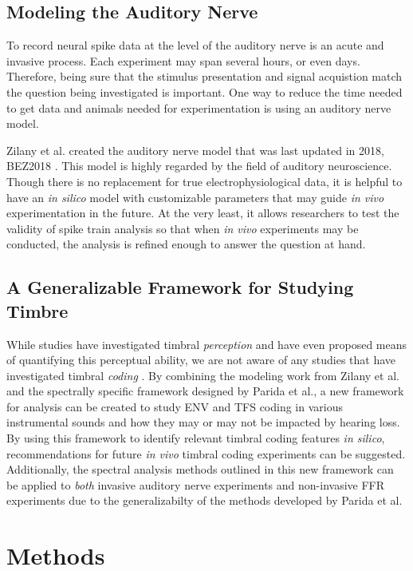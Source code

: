 \documentclass[conference]{IEEEtran}
\begin{document}
\subsection{Modeling the Auditory Nerve} 

To record neural spike data at the level of the auditory nerve is an acute and invasive process. Each experiment may span several hours, or even days.  Therefore, being sure that the stimulus presentation and signal acquistion match the question being investigated is important. One way to reduce the time needed to get data and animals needed for experimentation is using an auditory nerve model.

Zilany et al. created the auditory nerve model that was last updated in 2018, BEZ2018 \cite{bruce_phenomenological_2018}. This model is highly regarded by the field of auditory neuroscience. Though there is no replacement for true electrophysiological data, it is helpful to have an \textit{in silico} model with customizable parameters that may guide \textit{in vivo} experimentation in the future. At the very least, it allows researchers to test the validity of spike train analysis so that when \textit{in vivo} experiments may be conducted, the analysis is refined enough to answer the question at hand.
 
\subsection{A Generalizable Framework for Studying Timbre} 
 
While studies have investigated timbral \textit{perception} and have even proposed means of quantifying this perceptual ability, we are not aware of any studies that have investigated timbral \textit{coding} \cite{lee_timbre_2020}. By combining the modeling work from Zilany et al. and the spectrally specific framework designed by Parida et al., a new framework for analysis can be created to study ENV and TFS coding in various instrumental sounds and how they may or may not be impacted by hearing loss. By using this framework to identify relevant timbral coding features \textit{in silico}, recommendations for future \textit{in vivo} timbral coding experiments can be suggested. Additionally, the spectral analysis methods outlined in this new framework can be applied to \textit{both} invasive auditory nerve experiments and non-invasive FFR experiments due to the generalizabilty of the methods developed by Parida et al.
 
\section{Methods}
\end{document}
